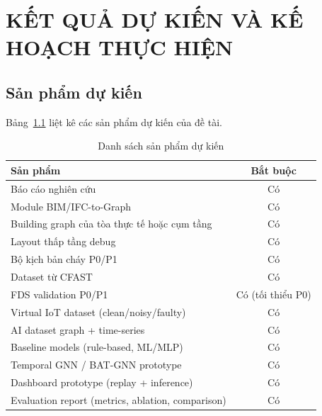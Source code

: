 
\chapter{KẾT QUẢ DỰ KIẾN VÀ KẾ HOẠCH THỰC HIỆN}
\label{chap:kehoach}

\section{Sản phẩm dự kiến}
\label{sec:sanpham}

Bảng~\ref{tab:deliverables} liệt kê các sản phẩm dự kiến của đề tài.

\begin{table}[H]
\centering
\caption{Danh sách sản phẩm dự kiến}
\label{tab:deliverables}
\begin{tabularx}{\textwidth}{X c}
\toprule
\textbf{Sản phẩm} & \textbf{Bắt buộc} \\
\midrule
Báo cáo nghiên cứu                                     & Có \\
Module BIM/IFC-to-Graph                                 & Có \\
Building graph của tòa thực tế hoặc cụm tầng           & Có \\
Layout thấp tầng debug                                  & Có \\
Bộ kịch bản cháy P0/P1                                 & Có \\
Dataset từ CFAST                                        & Có \\
FDS validation P0/P1                                    & Có (tối thiểu P0) \\
Virtual IoT dataset (clean/noisy/faulty)                & Có \\
AI dataset graph + time-series                          & Có \\
Baseline models (rule-based, ML/MLP)                    & Có \\
Temporal GNN / BAT-GNN prototype                       & Có \\
Dashboard prototype (replay + inference)                & Có \\
Evaluation report (metrics, ablation, comparison)       & Có \\
\bottomrule
\end{tabularx}
\end{table}

